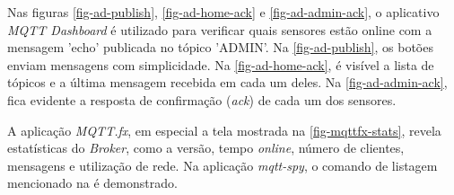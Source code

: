 Nas figuras \ref{fig-ad-publish}, \ref{fig-ad-home-ack} e \ref{fig-ad-admin-ack},
o aplicativo \emph{MQTT Dashboard} é utilizado para verificar quais sensores
estão online com a mensagem 'echo' publicada no tópico 'ADMIN'. Na
\autoref{fig-ad-publish}, os botões enviam mensagens com simplicidade. Na
\autoref{fig-ad-home-ack}, é visível a lista de tópicos e a última mensagem
recebida em cada um deles. Na \autoref{fig-ad-admin-ack}, fica evidente a
resposta de confirmação (\emph{ack}) de cada um dos sensores.

A aplicação \emph{MQTT.fx}, em especial a tela mostrada na
\autoref{fig-mqttfx-stats}, revela estatísticas do \emph{Broker}, como a versão,
tempo \emph{online}, número de clientes, mensagens e utilização de rede.
Na aplicação \emph{mqtt-spy}, o comando de listagem mencionado na
 é demonstrado.

